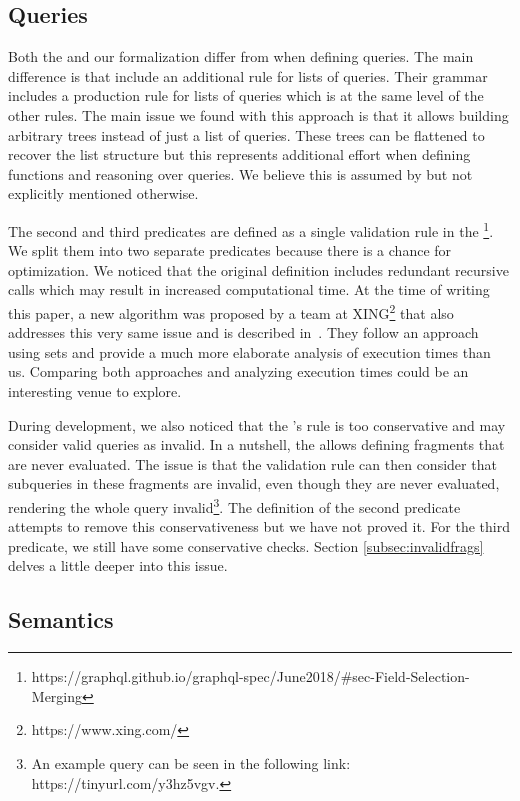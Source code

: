 \subsection{Queries}


Both the \spec{} and our formalization differ from \HP{} when defining queries. The main difference is that \HP{} include an additional rule for lists of queries. Their grammar includes a production rule for lists of queries which is at the same level of the other rules. The main issue we found with this approach is that it allows building arbitrary trees instead of just a list of queries. These trees can be flattened to recover the list structure but this represents additional effort when defining functions and reasoning over queries. We believe this is assumed by \HP{} but not explicitly mentioned otherwise.


The second and third predicates are defined as a single validation rule in the \spec{}\footnote{https://graphql.github.io/graphql-spec/June2018/\#sec-Field-Selection-Merging}. We split them into two separate predicates because there is a chance for optimization. We noticed that the original definition includes redundant recursive calls which may result in increased computational time. At the time of writing this paper, a new algorithm was proposed by a team at XING\footnote{https://www.xing.com/} that also addresses this very same issue and is described in~\cite{xingalg}. They follow an approach using sets and provide a much more elaborate analysis of execution times than us. Comparing both approaches and analyzing execution times could be an interesting venue to explore.


During development, we also noticed that the \spec{}'s rule is too conservative and may consider valid queries as invalid. In a nutshell, the \spec{} allows defining fragments that are never evaluated. The issue is that the validation rule can then consider that subqueries in these fragments are invalid, even though they are never evaluated, rendering the whole query invalid\footnote{An example query can be seen in the following link: https://tinyurl.com/y3hz5vgv.}. The definition of the second predicate attempts to remove this conservativeness but we have not proved it. For the third predicate, we still have some conservative checks. Section \ref{subsec:invalidfrags} delves a little deeper into this issue.


\subsection{Semantics}

